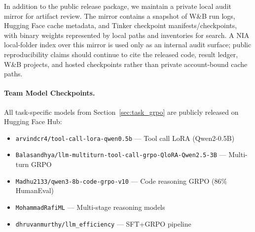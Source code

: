 \documentclass{article}
\begin{document}
In addition to the public release package, we maintain a private local audit
mirror for artifact review.  The mirror contains a snapshot of W\&B run logs,
Hugging Face cache metadata, and Tinker checkpoint manifests/checkpoints, with
binary weights represented by local paths and inventories for search.  A NIA
local-folder index over this mirror is used only as an internal audit surface;
public reproducibility claims should continue to cite the released code,
result ledger, W\&B projects, and hosted checkpoints rather than private
account-bound cache paths.

\paragraph{Team Model Checkpoints.}
All task-specific models from Section~\ref{sec:task_grpo} are publicly released
on Hugging Face Hub:
\begin{itemize}
    \item \texttt{arvindcr4/tool-call-lora-qwen0.5b} --- Tool call LoRA (Qwen2-0.5B)
    \item \texttt{Balasandhya/llm-multiturn-tool-call-grpo-QloRA-Qwen2.5-3B} --- Multi-turn GRPO
    \item \texttt{Madhu2133/qwen3-8b-code-grpo-v10} --- Code reasoning GRPO (86\% HumanEval)
    \item \texttt{MohammadRafiML} --- Multi-stage reasoning models
    \item \texttt{dhruvanmurthy/llm\_efficiency} --- SFT+GRPO pipeline
\end{itemize}

\end{document}
